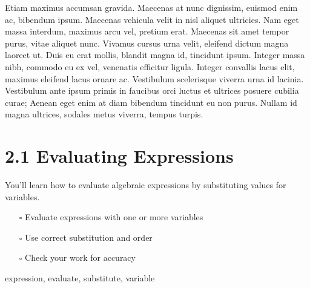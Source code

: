\documentclass[
  letterpaper,
]{scrrept}
\providecommand{\tightlist}{%
  \setlength{\itemsep}{0pt}\setlength{\parskip}{0pt}}
\begin{document}
Etiam maximus accumsan gravida. Maecenas at nunc dignissim, euismod enim
ac, bibendum ipsum. Maecenas vehicula velit in nisl aliquet ultricies.
Nam eget massa interdum, maximus arcu vel, pretium erat. Maecenas sit
amet tempor purus, vitae aliquet nunc. Vivamus cursus urna velit,
eleifend dictum magna laoreet ut. Duis eu erat mollis, blandit magna id,
tincidunt ipsum. Integer massa nibh, commodo eu ex vel, venenatis
efficitur ligula. Integer convallis lacus elit, maximus eleifend lacus
ornare ac. Vestibulum scelerisque viverra urna id lacinia. Vestibulum
ante ipsum primis in faucibus orci luctus et ultrices posuere cubilia
curae; Aenean eget enim at diam bibendum tincidunt eu non purus. Nullam
id magna ultrices, sodales metus viverra, tempus turpis.

\chapter*{2.1 Evaluating Expressions}\label{evaluating-expressions}


You'll learn how to evaluate algebraic expressions by substituting
values for variables.

\begin{tcolorbox}[enhanced jigsaw, colframe=quarto-callout-note-color-frame, opacitybacktitle=0.6, arc=.35mm, coltitle=black, leftrule=.75mm, toprule=.15mm, opacityback=0, bottomrule=.15mm, breakable, title={🎯 Objectives}, colback=white, bottomtitle=1mm, toptitle=1mm, titlerule=0mm, rightrule=.15mm, left=2mm, colbacktitle=quarto-callout-note-color!10!white]

\begin{itemize}
\tightlist
\item[$\square$]
  Evaluate expressions with one or more variables
\item[$\square$]
  Use correct substitution and order
\item[$\square$]
  Check your work for accuracy
\end{itemize}

\end{tcolorbox}

\begin{tcolorbox}[enhanced jigsaw, colframe=quarto-callout-note-color-frame, opacitybacktitle=0.6, arc=.35mm, coltitle=black, leftrule=.75mm, toprule=.15mm, opacityback=0, bottomrule=.15mm, breakable, title=\textcolor{quarto-callout-note-color}{\faInfo}\hspace{0.5em}{Vocabulary}, colback=white, bottomtitle=1mm, toptitle=1mm, titlerule=0mm, rightrule=.15mm, left=2mm, colbacktitle=quarto-callout-note-color!10!white]

expression, evaluate, substitute, variable

\end{tcolorbox}
\end{document}
